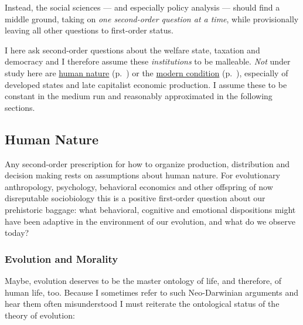 Instead, the social sciences --- and especially policy analysis --- should find a middle ground, taking on \emph{one second-order question at a time}, while provisionally leaving all other questions to first-order status. 

I here ask second-order questions about the welfare state, taxation and democracy and I therefore assume these \emph{institutions} to be malleable. 
\emph{Not} under study here are \hyperref[sec:human-nature]{human nature} (p.~\pageref{sec:human-nature}) or the \hyperref[sec:modernity]{modern condition} (p.~\pageref{sec:modernity}), especially of developed states and late capitalist economic production. 
I assume these to be constant in the medium run and reasonably approximated in the following sections.

\subsection[Human Nature]{Human Nature} \label{sec:human-nature}
Any second-order prescription for how to organize production, distribution and decision making rests on assumptions about human nature. 
For evolutionary anthropology, psychology, behavioral economics and other offspring of now disreputable \citep{Wright1994} sociobiology \citep{Wilson1975} this is a positive first-order question about our prehistoric baggage: what behavioral, cognitive and emotional dispositions might have been adaptive in the environment of our evolution, and what do we observe today?

\subsubsection[Evolution and Morality]{Evolution and Morality} 
Maybe, evolution deserves to be the master ontology of life, and therefore, of human life, too.
Because I sometimes refer to such Neo-Darwinian arguments \citep{Wright1994} and hear them often misunderstood I must reiterate the ontological status of the theory of evolution:

